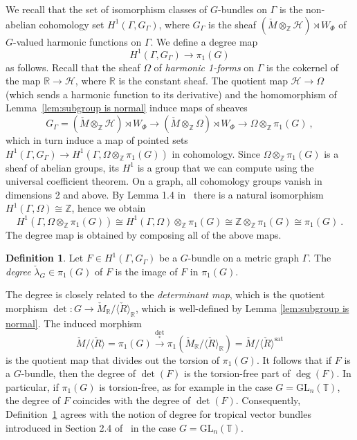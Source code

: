 \documentclass[10pt, a4paper]{amsart}
\theoremstyle{definition}
\newtheorem{definition}[theorem]{Definition}
\theoremstyle{myitemstyle}
\newcommand{\R}{\mathbb{R}}
\newcommand{\ZZ}{\mathbb{Z}}
\newcommand{\RR}{\mathbb{R}}
\newcommand{\TT}{\mathbb{T}}
\newcommand{\Mcheck}{{\check{M}}}
\newcommand{\Rcheck}{\check{R}}
\newcommand{\calH}{\mathcal{H}}
\newcommand{\GL}{{\mathrm{GL}}}
\newcommand{\sat}{\mathrm{sat}}
\newcommand{\Ga}{\Gamma}
\begin{document}
We recall that the set of isomorphism classes of $G$-bundles on $\Ga$ is the non-abelian cohomology set $H^1(\Ga,G_{\Ga})$, where $G_{\Ga}$ is the sheaf $(\Mcheck\otimes_{\ZZ}\calH) \rtimes W_{\Phi}$ of $G$-valued harmonic functions on $\Ga$. We define a degree map 
\[
H^1(\Ga,G_\Ga)\to \pi_1(G)
\]
as follows. Recall that the sheaf $\Omega$ of \emph{harmonic 1-forms} on $\Ga$ is the cokernel of the map $\RR\to \calH$, where $\RR$ is the constant sheaf. The quotient map $\calH\to \Omega$ (which sends a harmonic function to its derivative) and the homomorphism of Lemma~\ref{lem:subgroup is normal} induce maps of sheaves
\[
G_{\Ga}=(\Mcheck\otimes_{\ZZ}\calH) \rtimes W_{\Phi}\longrightarrow  (\Mcheck\otimes_{\ZZ}\Omega) \rtimes W_{\Phi}\longrightarrow  \Omega\otimes_{\ZZ} \pi_1(G) \ ,
\]
which in turn induce a map of pointed sets $H^1(\Ga,G_{\Ga})\to H^1(\Ga,\Omega\otimes_{\ZZ} \pi_1(G))$ in cohomology. Since $\Omega\otimes_{\ZZ}\pi_1(G)$ is a sheaf of abelian groups, its $H^1$ is a group that we can compute using the universal coefficient theorem. On a graph, all cohomology groups vanish in dimensions 2 and above. By Lemma 1.4 in~\cite{2022GrossUlirschZakharov} there is a natural isomorphism $H^1(\Ga,\Omega)\cong \ZZ$, hence we obtain
\[
H^1(\Gamma,\Omega\otimes_{\ZZ} \pi_1(G))\cong H^1(\Gamma,\Omega)\otimes_{\ZZ}\pi_1(G)\cong \ZZ\otimes_{\ZZ}\pi_1(G)\cong \pi_1(G) \ .
\]
The degree map is obtained by composing all of the above maps. 





\begin{definition}
\label{def:degree}
Let $F\in H^1(\Gamma, G_{\Ga})$ be a $G$-bundle on a metric graph $\Gamma$. The \emph{degree} $\check{\lambda}_G\in \pi_1(G)$ of $F$ is the image of $F$ in $\pi_1(G)$.
\end{definition}

The degree is closely related to the \emph{determinant map}, which is the quotient morphism $\det\colon G\to \Mcheck_\R/\langle \Rcheck\rangle_\R$, which is well-defined by Lemma \ref{lem:subgroup is normal}. The induced morphism 
\[
\Mcheck/\langle \Rcheck\rangle =\pi_1(G)\xrightarrow{\det_*} \pi_1(\Mcheck_\R/\langle\Rcheck\rangle_\R)= \Mcheck/\langle \Rcheck\rangle^\sat 
\]
is the quotient map that divides out the torsion of $\pi_1(G)$. It follows that if $F$ is a $G$-bundle, then the degree of $\det(F)$ is the torsion-free part of $\deg(F)$. In particular, if $\pi_1(G)$ is torsion-free, as for example in the case $G = \GL_n(\TT)$, the degree of $F$ coincides with the degree of $\det(F)$.  Consequently, Definition~\ref{def:degree} agrees with the notion of degree for tropical vector bundles introduced in Section 2.4 of~\cite{2022GrossUlirschZakharov} in the case $G=\GL_n(\TT)$.
\end{document}
